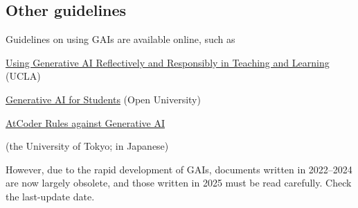 \documentclass[11pt,pdfa,lastpage,minititle]{MishoNote}
\begin{document}
\subsection*{Other guidelines}
Guidelines on using GAIs are available online, such as
\begin{miniitemize}
 \item \href{https://teaching.ucla.edu/resources/teaching-guides/using-generative-ai-reflectively-and-responsibly-in-teaching-and-learning/}{Using Generative AI Reflectively and Responsibly in Teaching and Learning} (UCLA)
 \item \href{https://about.open.ac.uk/policies-and-reports/policies-and-statements/gen-ai/generative-ai-students}{Generative AI for Students} (Open University)
 \item \href{https://info.atcoder.jp/entry/llm-rules-en}{AtCoder Rules against Generative AI}
  \item \href{https://utelecon.adm.u-tokyo.ac.jp/docs/ai-tools-in-classes}{} (the University of Tokyo; in Japanese)
\end{miniitemize}
However, due to the rapid development of GAIs, documents written in 2022--2024 are now largely obsolete, and those written in 2025 must be read carefully.
Check the last-update date.
\end{document}

